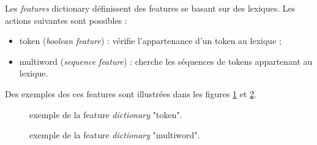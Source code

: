 \documentclass[manual-fr.tex]{subfiles}
\begin{document}
Les \textit{features} dictionary définissent des features se basant sur des lexiques. Les actions suivantes sont possibles :
\begin{itemize}
    \item token (\textit{boolean feature}) : vérifie l'appartenance d'un token au lexique ;
    \item multiword (\textit{sequence feature}) : cherche les séquences de tokens appartenant au lexique.
\end{itemize}

Des exemples des ces features sont illustrées dans les figures \ref{fig:feature-dictionary-token} et \ref{fig:feature-dictionary-multiword}.

\begin{figure}[ht!]
\footnotesize
\begin{xml}
\end{xml}
\caption{exemple de la feature \textit{dictionary} "token".}
\label{fig:feature-dictionary-token}
\end{figure}

\begin{figure}[ht!]
\footnotesize
\begin{xml}
\end{xml}
\caption{exemple de la feature \textit{dictionary} "multiword".}
\label{fig:feature-dictionary-multiword}
\end{figure}
\end{document}
